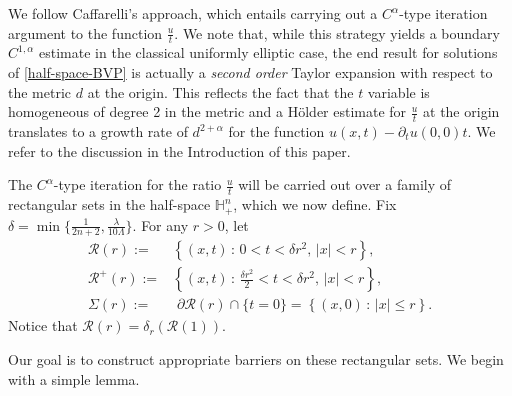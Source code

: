 \documentclass[12pt]{amsart}
\def \H {{\mathbb H}}
\def \r {\mathcal R}
\def \a {\alpha}
\begin{document}
We follow Caffarelli's approach, which entails carrying out a $C^{\a}$-type iteration argument to the function $\frac{u}{t}$. We note that, while this strategy yields a boundary $C^{1,\a}$ estimate in the classical uniformly elliptic case, the end result for solutions of \eqref{half-space-BVP} is actually a \emph{second order} Taylor expansion with respect to the metric $d$ at the origin. This reflects the fact that the $t$ variable is homogeneous of degree 2 in the metric and a H\"older estimate for $\frac{u}{t}$ at the origin translates to a growth rate of $d^{2+\a}$ for the function $u(x,t) - \partial_t u(0,0) t$. We refer to the discussion in the Introduction of this paper. 

The $C^{\a}$-type iteration for the ratio $\frac{u}{t}$ will be carried out over a family of rectangular sets in the half-space $\H^n_+$, which we now define. Fix $\delta=\min\{\frac{1}{2n+2}, \frac{\lambda}{10\Lambda}\}$. For any $r>0$, let
\begin{align*}
\r(r) := &\left\{(x,t)\,:\, 0<t<\delta r^2,\, |x|<r\right\}, \\
\r^+(r) := &\left\{(x,t)\,:\, \frac{\delta r^2}{2} <t<\delta r^2,\, |x|<r\right\}, \\
\Sigma(r) := & \,\, \partial \r(r) \cap \{t = 0\}=\left\{(x,0)\,:\, |x|\leq r\right\}.
\end{align*}
Notice that $\r(r) = \delta_r(\r(1))$.

Our goal is to construct appropriate barriers on these rectangular sets. We begin with a simple lemma.
\end{document}
